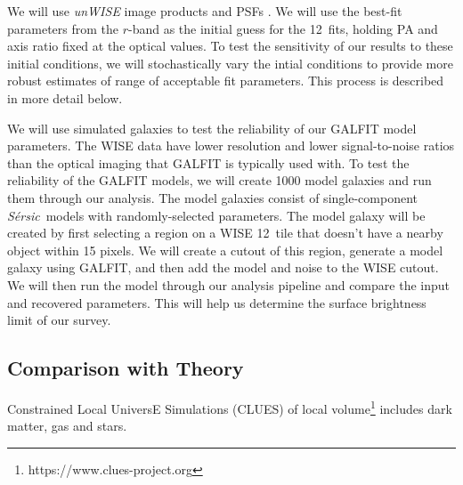 \documentclass[12pt, preprint]{aastex}
\newcommand{\sers}{{\it S\'{e}rsic}}
\begin{document}
{We will use {\it unWISE} image products and PSFs \citep{lang14}.
We will use the best-fit parameters from the $r$-band as the initial
guess for the 12\micron \ fits, holding PA and axis ratio fixed at the
optical values.  To test the sensitivity of our results to these
initial conditions, we will stochastically vary  the intial
conditions to provide more robust estimates of range of acceptable
fit parameters.  This process is described in more detail below.


We will use simulated galaxies to test the reliability of our GALFIT
model parameters.  The WISE  data have lower resolution and
lower signal-to-noise ratios than the optical imaging that
GALFIT is typically used with. To test the reliability of the GALFIT models, 
we will create 1000 model galaxies 
and run them through our analysis.
The model galaxies consist of single-component \sers \ models with
randomly-selected parameters. The model galaxy will be created by first selecting 
a region on a WISE 12\micron \ tile that doesn't have a nearby object within 15
pixels.  We will create a cutout of this region, generate a model galaxy
using GALFIT, and then add the model and noise to the WISE cutout.
We will then run the model through our analysis pipeline and compare
the input and recovered parameters.  This will help us determine the
surface brightness limit of our survey.


\vspace*{-1cm}
\subsection{Comparison with Theory}
\vspace*{-.4cm}

Constrained Local UniversE Simulations (CLUES) of local
volume\footnote{https://www.clues-project.org} includes dark matter,
gas and stars.




}
\end{document}
